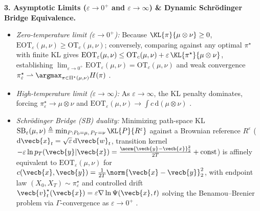 \documentclass[../../../../master.tex]{subfiles}
\begin{document}
\begin{coremath}
\textbf{3. Asymptotic Limits ($\varepsilon \to 0^+$ and $\varepsilon \to \infty$) \& Dynamic Schr\"odinger Bridge Equivalence.}
\begin{itemize}[leftmargin=1.4em]
  \item \emph{Zero-temperature limit ($\varepsilon \to 0^+$):} Because $\KL{\pi}{\mu \otimes \nu} \ge 0$, $\mathrm{EOT}_\varepsilon(\mu,\nu) \ge \mathrm{OT}_c(\mu,\nu)$; conversely, comparing against any optimal $\pi^\star$ with finite KL gives $\mathrm{EOT}_\varepsilon(\mu,\nu) \le \mathrm{OT}_c(\mu,\nu) + \varepsilon\,\KL{\pi^\star}{\mu\otimes\nu}$, establishing $\lim_{\varepsilon\to 0^+}\mathrm{EOT}_\varepsilon(\mu,\nu) = \mathrm{OT}_c(\mu,\nu)$ and weak convergence $\pi_\varepsilon^\star \rightharpoonup \argmax_{\pi \in \Pi^\star(\mu,\nu)} H(\pi)$  .
  \item \emph{High-temperature limit ($\varepsilon \to \infty$):} As $\varepsilon \to \infty$, the KL penalty dominates, forcing $\pi_\varepsilon^\star \to \mu \otimes \nu$ and $\mathrm{EOT}_\varepsilon(\mu,\nu) \to \int c\,\mathrm{d}(\mu \otimes \nu)$ .
  \item \emph{Schr\"odinger Bridge (SB) duality:} Minimizing path-space KL $\mathrm{SB}_\varepsilon(\mu, \nu) \triangleq \min_{P : P_0 = \mu,\, P_T = \nu} \KL{P}{R^\varepsilon}$ against a Brownian reference $R^\varepsilon$ ($\mathrm{d}\vecb{x}_t = \sqrt{\varepsilon}\,\mathrm{d}\vecb{w}_t$, transition kernel $-\varepsilon\ln p_T(\vecb{y}|\vecb{x}) = \frac{\norm{\vecb{y}-\vecb{x}}_2^2}{2T} + \text{const}$) is affinely equivalent to $\mathrm{EOT}_\varepsilon(\mu,\nu)$ for $c(\vecb{x},\vecb{y}) = \frac{1}{2T}\norm{\vecb{x}-\vecb{y}}_2^2$, with endpoint law $(X_0, X_T) \sim \pi_\varepsilon^\star$ and controlled drift $\vecb{v}_t^\star(\vecb{x}) = \varepsilon \nabla \ln \Psi(\vecb{x}, t)$ solving the Benamou--Brenier problem via $\Gamma$-convergence as $\varepsilon \to 0^+$ .
\end{itemize}


\end{coremath}
\end{document}
